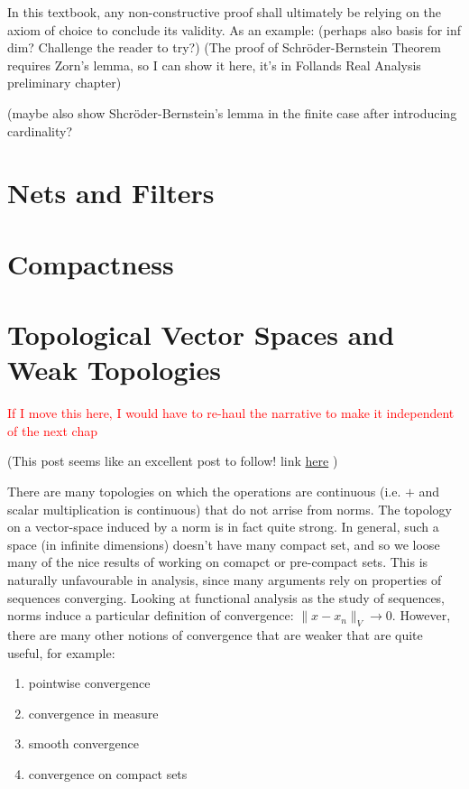 \documentclass[oneside]{book}
\begin{document}
In this textbook, any non-constructive proof shall ultimately be relying on the axiom of choice to conclude
its validity. As an example: (perhaps also basis for inf dim? Challenge the reader to try?)
(The proof of Schr\"oder-Bernstein Theorem requires Zorn's lemma, so I can show it here, it's in Follands Real Analysis
preliminary chapter)

(maybe also show Shcr\"oder-Bernstein's lemma in the finite case after introducing cardinality?
\section{Nets and Filters}\label{sec:netsAndFilters}

\section{Compactness}\label{sec:compactness}

\section{Topological Vector Spaces and Weak Topologies}\label{sec:TVS}
\textcolor{red}{If I move this here, I would have to re-haul the narrative to make it independent of the next
chap}


(This post seems like an excellent post to follow! link
\href{https://terrytao.wordpress.com/2009/02/21/245b-notes-11-the-strong-and-weak-topologies/}{here} )

There are many topologies on which the operations are continuous (i.e. $+$ and scalar multiplication is continuous) that
do not arrise from norms. The topology on a vector-space induced by a norm is in fact quite strong. In general, such
a space (in infinite dimensions) doesn't have many compact set, and so we loose many of the nice results of working on
comapct or pre-compact sets. This is naturally unfavourable in analysis, since many arguments rely on properties of
sequences converging. Looking at functional analysis as the study of sequences, norms induce a particular definition of
convergence: $\|x -x_n\|_V \to 0$. However, there are many other notions of convergence that are weaker that are quite
useful, for example:
\begin{enumerate}
	\item pointwise convergence
	\item convergence in measure
	\item smooth convergence
	\item convergence on compact sets
\end{enumerate}
\end{document}
